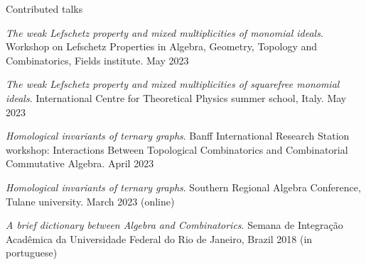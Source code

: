 \documentclass[12pt]{resume} %
\begin{document}
\begin{rSection}{Contributed talks}
    \item \textit{The weak Lefschetz property and mixed multiplicities of monomial ideals}. Workshop on Lefschetz Properties in Algebra, Geometry, Topology and Combinatorics, Fields institute. May 2023 
    \item \textit{The weak Lefschetz property and mixed multiplicities of squarefree monomial ideals}. International Centre for Theoretical Physics summer school, Italy. May 2023 
    \item \textit{Homological invariants of ternary graphs}. Banff International Research Station workshop: Interactions Between Topological Combinatorics and Combinatorial Commutative Algebra. April 2023 
    \item \textit{Homological invariants of ternary graphs}. Southern Regional Algebra Conference, Tulane university. March 2023 (online)
    \item \textit{A brief dictionary between Algebra and Combinatorics}. Semana de Integração Acadêmica da Universidade Federal do Rio de Janeiro, Brazil 2018 (in portuguese)
    
\end{rSection}
\end{document}
